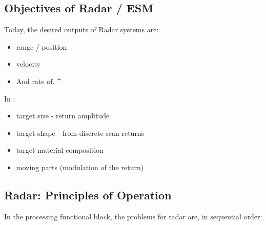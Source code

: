 \subsection{Objectives of Radar / ESM}

Today, the desired outputs of Radar systems are: \cite{stimson_introduction_1998}

\begin{itemize}
    \item range / position
    \item velocity
    \item And rate of. \^\^
\end{itemize}

In :\cite{jenn_radar_2007}
\begin{itemize}
    \item target size - return amplitude
    \item target shape - from discrete scan returns
    \item target material composition
    \item moving parts (modulation of the return)
\end{itemize}












\subsection{Radar: Principles of Operation}



In the processing functional block, the problems for radar are, in sequential order:

